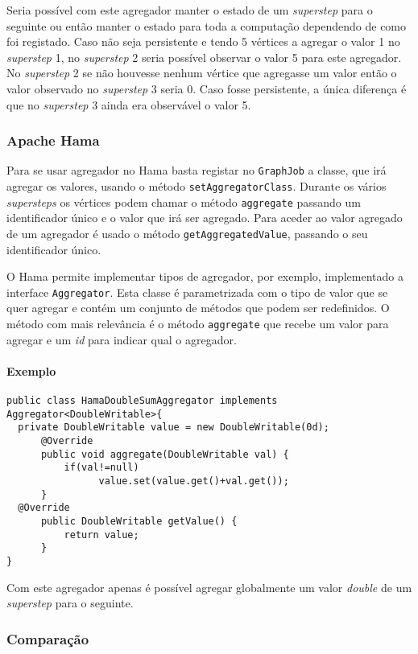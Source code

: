 Seria possível com este agregador manter o estado de um \textit{superstep} para 
o seguinte ou então manter o estado para toda a computação dependendo de como 
foi registado. Caso não seja persistente e tendo 5 vértices a agregar o valor 1 
no \textit{superstep} 1, no \textit{superstep} 2 seria possível observar o 
valor 5 para este agregador. No \textit{superstep} 2 se não houvesse nenhum 
vértice que agregasse um valor então o valor observado no \textit{superstep} 3 
seria 0. Caso fosse persistente, a única diferença é que no \textit{superstep} 
3 ainda era observável o valor 5.

\subsubsection*{Apache Hama}
    Para se usar agregador no Hama basta registar no \texttt{GraphJob} a classe, que irá agregar os valores, usando o método
    \texttt{setAggregatorClass}. Durante os vários \textit{supersteps} os 
vértices podem chamar o método \texttt{aggregate} passando um identificador 
único
    e o valor que irá ser agregado. Para aceder ao valor agregado de um 
agregador é usado o método \texttt{getAggregatedValue}, passando o seu 
    identificador único.
    
    O Hama permite implementar tipos de agregador, por exemplo, implementado 
a interface \texttt{Aggregator}.
    Esta classe é parametrizada com o tipo de valor que se quer agregar e 
contém um conjunto de métodos que podem ser redefinidos.
O método com mais relevância é o método \texttt{aggregate} que recebe um 
valor para agregar e um \textit{id} para indicar qual o agregador.

\paragraph{Exemplo}
\begin{verbatim}
public class HamaDoubleSumAggregator implements Aggregator<DoubleWritable>{
  private DoubleWritable value = new DoubleWritable(0d);
	  @Override
	  public void aggregate(DoubleWritable val) {
	      if(val!=null)
		        value.set(value.get()+val.get());
	  }
  @Override
	  public DoubleWritable getValue() {
	      return value;
	  }
}
\end{verbatim}

  Com este agregador apenas é possível agregar globalmente um valor 
\textit{double} de um \textit{superstep} para o seguinte.

  \subsubsection*{Comparação}
  
